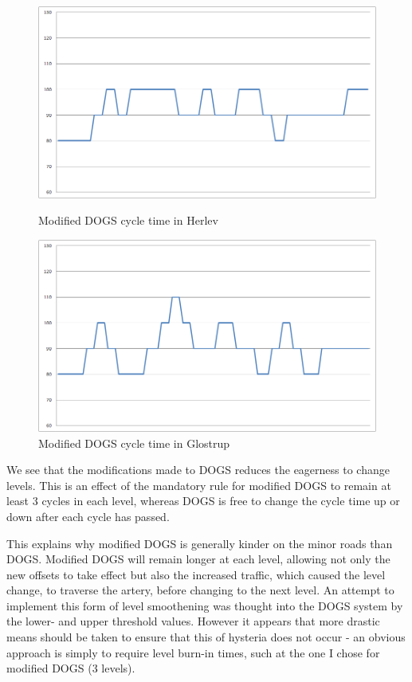 \begin{figure}[ht]
\begin{minipage}[b]{0.5\linewidth}
\centering
\includegraphics[scale=0.2]{C_modified-dogs_herlev.png}
\caption{Modified DOGS cycle time in Herlev}
\label{fig:c_modified-dogs_herlev}

    \end{minipage}
    \hspace{0.1cm}
    \begin{minipage}[b]{0.5\linewidth}

\centering
\includegraphics[scale=0.2]{C_modified-dogs_glostrup.png}
\caption{Modified DOGS cycle time in Glostrup}
\label{fig:c_modified-dogs_glostrup}

    \end{minipage}

\end{figure}

We see that the modifications made to DOGS reduces the eagerness to change levels. This is an effect of the mandatory rule for modified DOGS to remain at least 3 cycles in each level, whereas DOGS is free to change the cycle time up or down after each cycle has passed. 

This explains why modified DOGS is generally kinder on the minor roads than DOGS. Modified DOGS will remain longer at each level, allowing not only the new offsets to take effect but also the increased traffic, which caused the level change, to traverse the artery, before changing to the next level. An attempt to implement this form of level smoothening was thought into the DOGS system by the lower- and upper threshold values. However it appears that more drastic means should be taken to ensure that this of hysteria does not occur - an obvious approach is simply to require level burn-in times, such at the one I chose for modified DOGS (3 levels).

